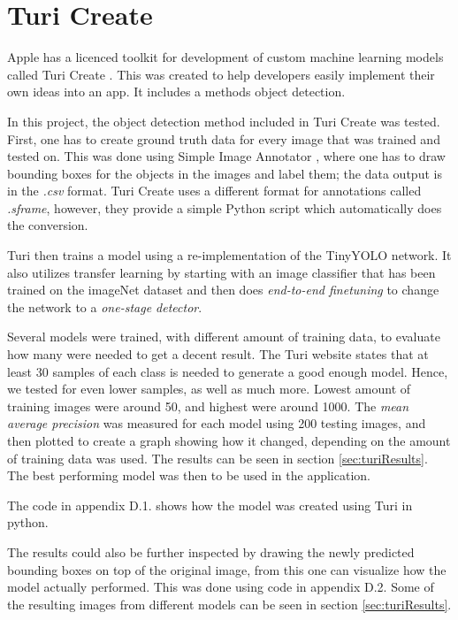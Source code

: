 \section{Turi Create}
\label{sec:turi}
Apple has a licenced toolkit for development of custom machine learning models called Turi Create \cite{turiCreate}. This was created to help developers easily implement their own ideas into an app. It includes a methods object detection.

In this project, the object detection method included in Turi Create was tested. First, one
 has to create ground truth data for every image that was trained and tested on. This was
 done using Simple Image Annotator \cite{simpleImage}, where one has to draw bounding
  boxes for the objects in the images and label them; the data output is in the \textit{.csv} format.  Turi Create uses a different format for annotations called \textit{.sframe},
  however, they provide a simple Python script which automatically does the conversion. 

Turi then trains a model using a re-implementation of the TinyYOLO network. It also utilizes transfer learning by starting with an image classifier that has been trained on the imageNet dataset and then does \textit{end-to-end finetuning} to change the network to a \textit{one-stage detector}.

Several models were trained, with different amount of training data, to evaluate how many
 were needed to get a decent result. The Turi website states that at least 30 samples of
each class is needed to generate a good enough model. Hence, we tested for even lower
samples, as well as much more. Lowest amount of training images were around 50, and
highest  were around 1000. The \textit{mean average precision} was measured for each model using 200 testing images, and then plotted to create a graph showing how it
 changed, depending on the amount of training data was used. The results can be seen in section \ref{sec:turiResults}. The best performing model was then to be used in the application.

The code in appendix D.1. shows how the model was created using Turi in python.

The results could also be further inspected by drawing the newly predicted bounding boxes on top of the original image, from this one can visualize how the model actually performed. This was done using code in appendix D.2. Some of the resulting images from different models can be seen in section \ref{sec:turiResults}. 


